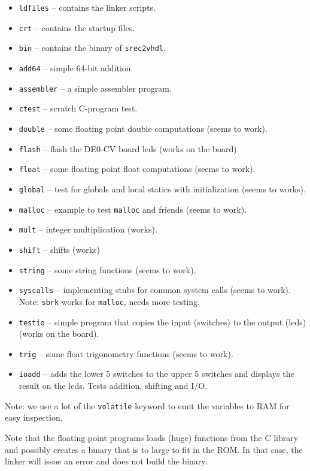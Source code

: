 \documentclass[12pt]{article}
\begin{document}
\begin{itemize}
\item \texttt{ldfiles} -- contains the linker scripts.
\item \texttt{crt} -- contains the startup files.
\item \texttt{bin} -- contains the binary of \texttt{srec2vhdl}.
\item \texttt{add64} -- simple 64-bit addition.
\item \texttt{assembler} -- a simple assembler program.
\item \texttt{ctest} -- scratch C-program test.
\item \texttt{double} -- some floating point double computations (seems to work).
\item \texttt{flash} -- flash the DE0-CV board leds (works on the board)
\item \texttt{float} -- some floating point float computations (seems to work).
\item \texttt{global} -- test for globals and local statics with initialization (seems to works).
\item \texttt{malloc} -- example to test \texttt{malloc} and friends (seems to work).
\item \texttt{mult} -- integer multiplication (works).
\item \texttt{shift} -- shifts (works)
\item \texttt{string} -- some string functions (seems to work).
\item \texttt{syscalls} -- implementing stubs for common system calls (seems to work). Note: \texttt{sbrk} works for \texttt{malloc}, needs more testing.
\item \texttt{testio} -- simple program that copies the input (switches) to the output (leds) (works on the board).
\item \texttt{trig} -- some float trigonometry functions (seems to work).
\item \texttt{ioadd} -- adds the lower 5 switches to the upper 5 switches and displays the result on the leds. Tests addition, shifting and I/O.
\end{itemize} 

Note: we use a lot of the \texttt{volatile} keyword to emit the variables to RAM for easy inspection.

Note that the floating point programs loads (huge) functions from the C library and possibly creates a binary that is to large to fit in the ROM. In that case, the linker will issue an error and does not build the binary.
\end{document}
